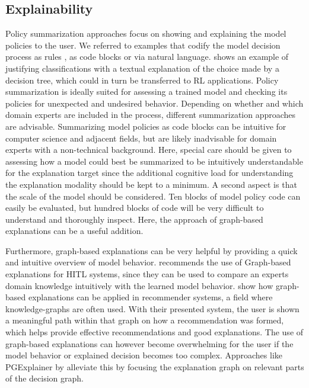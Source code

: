 \documentclass[twoside,11pt]{article}
\begin{document}
\subsection{Explainability}

Policy summarization approaches focus on showing and explaining the model policies to the user. We referred to examples that codify the model decision process as rules \citep{LiuEtAl:2018:LinearModelUTrees}, as code blocks \citep{VermaEtAl:2018:ProgrammaticallyInterpretableRL} or via natural language. \citet{AlonsoEtAl:2018:xAINLBeerClassifier} shows an example of justifying classifications with a textual explanation of the choice made by a decision tree, which could in turn be transferred to RL applications.
Policy summarization is ideally suited for assessing a trained model and checking its policies for unexpected and undesired behavior. Depending on whether and which domain experts are included in the process, different summarization approaches are advisable. Summarizing model policies as code blocks can be intuitive for computer science and adjacent fields, but are likely inadvisable for domain experts with a non-technical background. Here, special care should be given to assessing how a model could best be summarized to be intuitively understandable for the explanation target since the additional cognitive load for understanding the explanation modality should be kept to a minimum.
A second aspect is that the scale of the model should be considered. Ten blocks of model policy code can easily be evaluated, but hundred blocks of code will be very difficult to understand and thoroughly inspect. Here, the approach of graph-based explanations can be a useful addition.

Furthermore, graph-based explanations can be very helpful by providing a quick and intuitive overview of model behavior. \citet{HolzingerEtAl:2021:MultiModalCausabilityGNN} recommends the use of Graph-based explanations for HITL systems, since they can be used to compare an experts domain knowledge intuitively with the learned model behavior. \citet{SongEtAl:2019:ExplainableGraphBasedRecommendations} show how graph-based explanations can be applied in recommender systems, a field where knowledge-graphs are often used. With their presented system, the user is shown a meaningful path within that graph on how a recommendation was formed, which helps provide effective recommendations and good explanations.
The use of graph-based explanations can however become overwhelming for the user if the model behavior or explained decision becomes too complex. Approaches like PGExplainer by \citep{Vu:2020:PGMExplainer} alleviate this by focusing the explanation graph on relevant parts of the decision graph.
\end{document}
